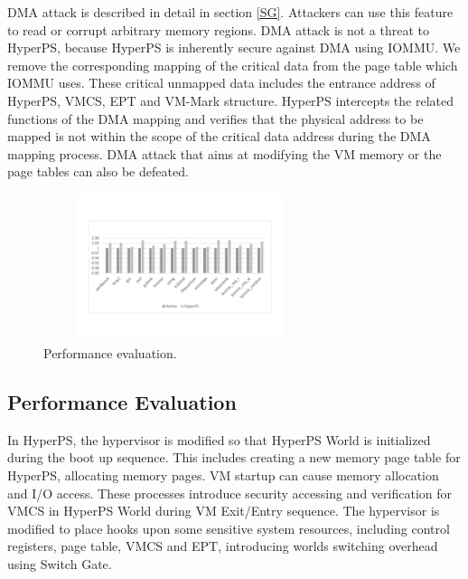 \documentclass[conference]{IEEEtran}
\begin{document}
 DMA attack is described in detail in section \ref{SG}. Attackers can use this feature to read or corrupt arbitrary memory regions. DMA attack is not a threat to HyperPS, because HyperPS is inherently secure against DMA using IOMMU. We remove the corresponding mapping of the critical data from the page table which IOMMU uses. These critical unmapped data includes the entrance address of HyperPS, VMCS, EPT and VM-Mark structure. 
HyperPS intercepts the related functions of the DMA mapping and verifies that the physical address to be mapped is not within the scope of the critical data address during the DMA mapping process.
DMA attack that aims at modifying the VM memory or the page tables can also be defeated.


\begin{figure}
\centerline{\includegraphics[width=8cm,height=4.3cm]{performance2.pdf}}
\caption{Performance evaluation.} \label{fig5}
\end{figure}


\subsection{Performance Evaluation}

In HyperPS, the hypervisor is modified so that HyperPS World is initialized during the boot up sequence. This includes creating a new memory page table for HyperPS, allocating memory pages. VM startup can cause memory allocation and I/O access. 
These processes introduce security accessing and verification for VMCS in HyperPS World during VM Exit/Entry sequence.
The hypervisor is modified to place hooks upon some sensitive system resources, including control registers, page table, VMCS and EPT,
introducing worlds switching overhead using Switch Gate.
\end{document}
